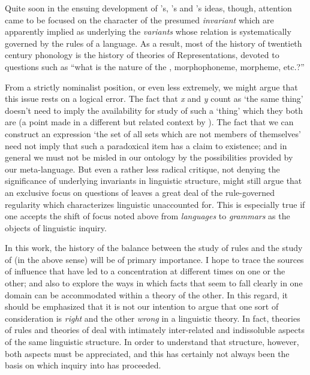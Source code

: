 Quite soon in the ensuing development of {\Saussure}'s, {\Baudouin}'s and
{\Kruszewski}'s ideas, though, attention came to be focused on the
character of the presumed \emph{invariant}  which are
apparently implied as underlying the \emph{variants} whose relation is
systematically governed by the {rules} of a language.  As a result, most
of the history of twentieth century phonology is the history of
theories of Representations, devoted to questions such as ``what is
the nature of the , morphophoneme, morpheme, etc.?''

From a strictly nominalist position, or even less extremely, we might
argue that this issue rests on a logical error. The fact that \emph{x}
and \emph{y} count as `the same thing' doesn't need to imply the
availability for study of such a `thing' which they both are (a point
made in a different but related context by
\citealt{linell79:psych.reality}).  The fact that we can construct an
expression `the set of all sets which are not members of themselves'
need not imply that such a paradoxical item has a claim to existence;
and in general we must not be misled in our ontology by the
possibilities provided by our meta-language.  But even a rather less
radical critique, not denying the significance of underlying
invariants in linguistic structure, might still argue that an
exclusive focus on questions of  leaves a great deal of
the rule-governed regularity which characterizes linguistic 
unaccounted for.  This is especially true if one accepts the shift of
focus noted above from \emph{languages} to \emph{grammars} as the
objects of linguistic inquiry.

In this work, the history of the balance between the study of {rules}
and the study of  (in the above sense) will be of
primary importance.  I hope to trace the sources of influence that
have led to a concentration at different times on one or the other;
and also to explore the ways in which facts that seem to fall clearly
in one domain can be accommodated within a theory of the other. In
this regard, it should be emphasized that it is not our intention to
argue that one sort of consideration is \emph{right} and the other
\emph{wrong} in a linguistic theory.  In fact, theories of {rules} and
theories of  deal with intimately inter-related and
indissoluble aspects of the same linguistic structure. In order to
understand that structure, however, both aspects must be appreciated,
and this has certainly not always been the basis on which inquiry into
 has proceeded.

